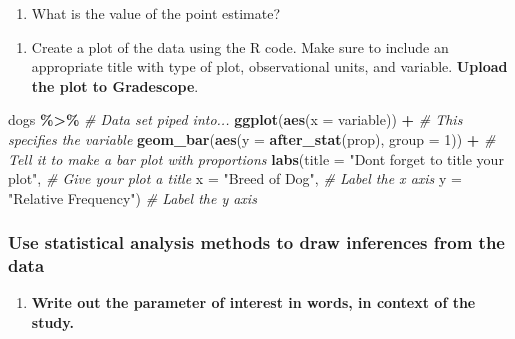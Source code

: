 \documentclass[
]{report}
\newenvironment{Shaded}{\begin{snugshade}}{\end{snugshade}}
\newcommand{\AttributeTok}[1]{\textcolor[rgb]{0.13,0.29,0.53}{#1}}
\newcommand{\CommentTok}[1]{\textcolor[rgb]{0.56,0.35,0.01}{\textit{#1}}}
\newcommand{\DecValTok}[1]{\textcolor[rgb]{0.00,0.00,0.81}{#1}}
\newcommand{\FunctionTok}[1]{\textcolor[rgb]{0.13,0.29,0.53}{\textbf{#1}}}
\newcommand{\NormalTok}[1]{#1}
\newcommand{\SpecialCharTok}[1]{\textcolor[rgb]{0.81,0.36,0.00}{\textbf{#1}}}
\newcommand{\StringTok}[1]{\textcolor[rgb]{0.31,0.60,0.02}{#1}}
\providecommand{\tightlist}{%
  \setlength{\itemsep}{0pt}\setlength{\parskip}{0pt}}
\begin{document}
\begin{enumerate}
\def\labelenumi{\arabic{enumi}.}
\tightlist
\item
  What is the value of the point estimate?
\end{enumerate}

\vspace{0.3in}

\begin{enumerate}
\def\labelenumi{\arabic{enumi}.}
\setcounter{enumi}{1}
\tightlist
\item
  Create a plot of the data using the R code. Make sure to include an appropriate title with type of plot, observational units, and variable. \textbf{Upload the plot to Gradescope}.
\end{enumerate}

\begin{Shaded}
\begin{Highlighting}[]
\NormalTok{dogs }\SpecialCharTok{\%\textgreater{}\%} \CommentTok{\# Data set piped into...}
    \FunctionTok{ggplot}\NormalTok{(}\FunctionTok{aes}\NormalTok{(}\AttributeTok{x =}\NormalTok{ variable)) }\SpecialCharTok{+}   \CommentTok{\# This specifies the variable}
    \FunctionTok{geom\_bar}\NormalTok{(}\FunctionTok{aes}\NormalTok{(}\AttributeTok{y =} \FunctionTok{after\_stat}\NormalTok{(prop), }\AttributeTok{group =} \DecValTok{1}\NormalTok{)) }\SpecialCharTok{+}  \CommentTok{\# Tell it to make a bar plot with proportions}
    \FunctionTok{labs}\NormalTok{(}\AttributeTok{title =} \StringTok{"Don\textquotesingle{}t forget to title your plot"}\NormalTok{,  }
       \CommentTok{\# Give your plot a title}
       \AttributeTok{x =} \StringTok{"Breed of Dog"}\NormalTok{,   }\CommentTok{\# Label the x axis}
       \AttributeTok{y =} \StringTok{"Relative Frequency"}\NormalTok{)  }\CommentTok{\# Label the y axis}
\end{Highlighting}
\end{Shaded}

\subsubsection*{Use statistical analysis methods to draw inferences from the data}\label{use-statistical-analysis-methods-to-draw-inferences-from-the-data-2}

\begin{enumerate}
\def\labelenumi{\arabic{enumi}.}
\setcounter{enumi}{2}
\tightlist
\item
  \textbf{Write out the parameter of interest in words, in context of the study.}
\end{enumerate}
\end{document}

